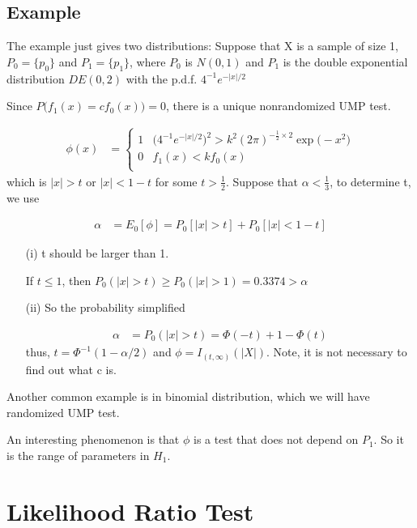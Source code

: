 \subsection{Example}
The example just gives two distributions: Suppose that X is a sample of size 1, $P_0 = \{ p_0\}$ and $P_1 = \{ p_1\}$, where $P_0$ is $N(0,1)$ and $P_1$ is the double exponential distribution $DE(0,2)$ with the p.d.f. $4^{-1} e^{-|x|/2}$

Since $P \Big( f_1(x) = cf_0(x) \Big) = 0$, there is a unique nonrandomized UMP test.

\begin{align*}
	\phi(x) &= \begin{cases}
	 1 & \Big( 4^{-1} e^{-|x|/2} \Big)^2 > k^2 (2\pi)^{-\frac{1}{2} \times 2} \exp \Big( -x^2 \Big) \\
	 0 & f_1(x) < k f_0(x) \\
	\end{cases}
\end{align*}
which is $|x| > t$ or $|x| < 1-t$ for some $t > \frac{1}{2}$. Suppose that $\alpha < \frac{1}{3}$, to determine t, we use

\begin{align*}
	\alpha &= E_0[\phi] = P_0[|x| > t] + P_0[|x| < 1-t] 
\end{align*}

\begin{itemize}
\item[(i)] t should be larger than 1.

If $t \leq 1$, then $P_0(|x| > t) \geq P_0(|x| > 1) = 0.3374 > \alpha$

\item[(ii)] So the probability simplified

\begin{align*}
	\alpha &= P_0(|x| > t) = \Phi(-t) + 1 - \Phi(t)
\end{align*}
thus, $t= \Phi^{-1} (1- \alpha/2)$ and $\phi = I_{(t, \infty)} (|X|)$. 
Note, it is not necessary to find out what c is.

\end{itemize}

Another common example is in binomial distribution, which we will have randomized UMP test.

An interesting phenomenon is that $\phi$ is a test that does not depend on $P_1$. So it is the range of parameters in $H_1$.




\section{Likelihood Ratio Test}

